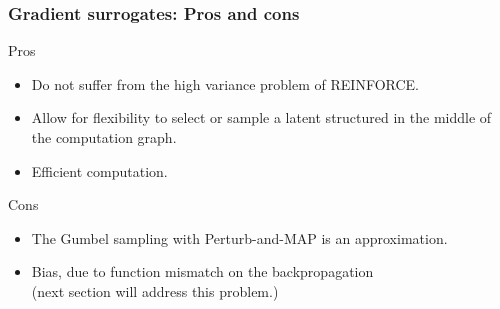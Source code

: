 
\begin{frame}%
\frametitle{Gradient surrogates: Pros and cons}%
\centering
Pros
\begin{itemize}
    \item Do not suffer from the high variance problem of REINFORCE.
    \item Allow for flexibility to select or sample a latent structured in the middle of the computation graph.
    \item Efficient computation.
\end{itemize}
Cons
\begin{itemize}
    \item The Gumbel sampling with Perturb-and-MAP is an approximation.
    \item Bias, due to function mismatch on the backpropagation\\\quad(next section will address this problem.)
\end{itemize}
\end{frame}

